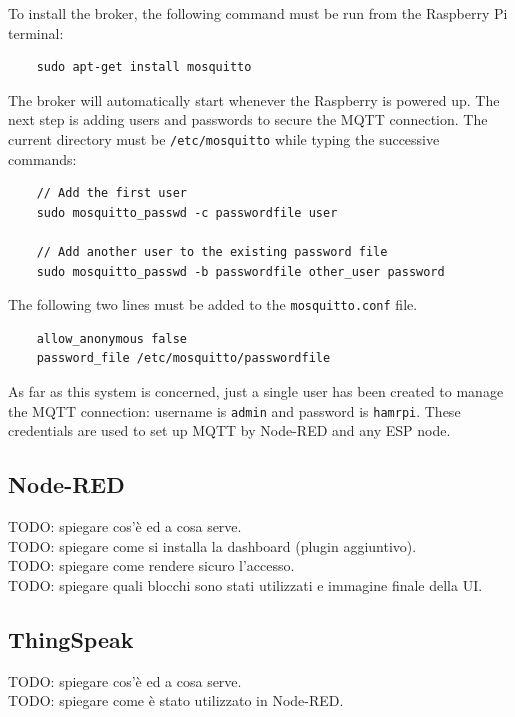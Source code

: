 To install the broker, the following command must be run from the Raspberry Pi terminal:

\begin{verbatim}
    sudo apt-get install mosquitto
\end{verbatim}

\noindent
The broker will automatically start whenever the Raspberry is powered up. The next step is adding users and passwords to secure the MQTT connection. The current directory must be \texttt{/etc/mosquitto} while typing the successive commands:

\begin{verbatim}
    // Add the first user
    sudo mosquitto_passwd -c passwordfile user
    
    // Add another user to the existing password file
    sudo mosquitto_passwd -b passwordfile other_user password
\end{verbatim}

\noindent
The following two lines must be added to the \texttt{mosquitto.conf} file.

\begin{verbatim}
    allow_anonymous false
    password_file /etc/mosquitto/passwordfile
\end{verbatim}

\noindent
As far as this system is concerned, just a single user has been created to manage the MQTT connection: username is \texttt{admin} and password is \texttt{hamrpi}. These credentials are used to set up MQTT by Node-RED and any ESP node.

\subsection{Node-RED}
TODO: spiegare cos'è ed a cosa serve. \\
TODO: spiegare come si installa la dashboard (plugin aggiuntivo). \\
TODO: spiegare come rendere sicuro l'accesso. \\
TODO: spiegare quali blocchi sono stati utilizzati e immagine finale della UI.

\subsection{ThingSpeak}
TODO: spiegare cos'è ed a cosa serve. \\
TODO: spiegare come è stato utilizzato in Node-RED.

